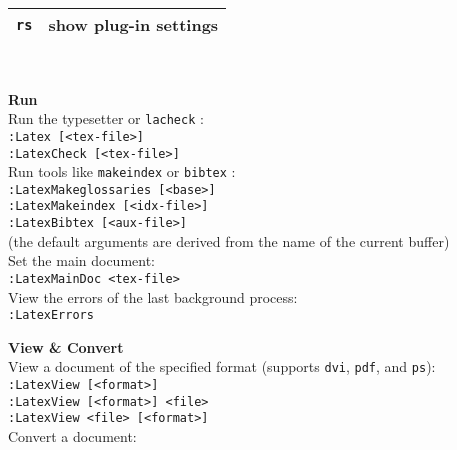 \documentclass[oneside,10pt,landscape,DIV16]{scrartcl}
\newcommand{\Map}[1] {\textbf{\textasciiacute}\texttt{#1}}
\begin{document}
\begin{multicols}{3}
\begin{center}
\begin{tabular}[]{|p{11mm}|p{62mm}|}
\hline \Map{rs}   & show plug-in settings                    \\
\hline
\end{tabular}\\[2.5ex]
%
\begin{minipage}[b]{70mm}%
\large{\textbf{Run}}\\[1.0ex]
Run the typesetter or \texttt{lacheck} : \\[1.0ex]
\texttt{:Latex [<tex-file>]} \\[1.0ex]
\texttt{:LatexCheck [<tex-file>]} \\[1.0ex]
Run tools like \texttt{makeindex} or \texttt{bibtex} : \\[1.0ex]
\texttt{:LatexMakeglossaries [<base>]} \\[1.0ex]
\texttt{:LatexMakeindex [<idx-file>]} \\[1.0ex]
\texttt{:LatexBibtex [<aux-file>]} \\[1.0ex]
(the default arguments are derived from the name of the current buffer) \\[1.0ex]
Set the main document: \\[1.0ex]
\texttt{:LatexMainDoc <tex-file>} \\[1.0ex]
View the errors of the last background process: \\[1.0ex]
\texttt{:LatexErrors}
\end{minipage}
%
%
\begin{minipage}[b]{70mm}%
\large{\textbf{View \& Convert}}\\[1.0ex]
View a document of the specified format
(supports \texttt{dvi}, \texttt{pdf}, and \texttt{ps}): \\[1.0ex]
\texttt{:LatexView [<format>]} \\[1.0ex]
\texttt{:LatexView [<format>] <file>} \\[1.0ex]
\texttt{:LatexView <file> [<format>]} \\[1.0ex]
Convert a document: \\[1.0ex]

\end{minipage}
\end{center}
\end{multicols}
\end{document}
